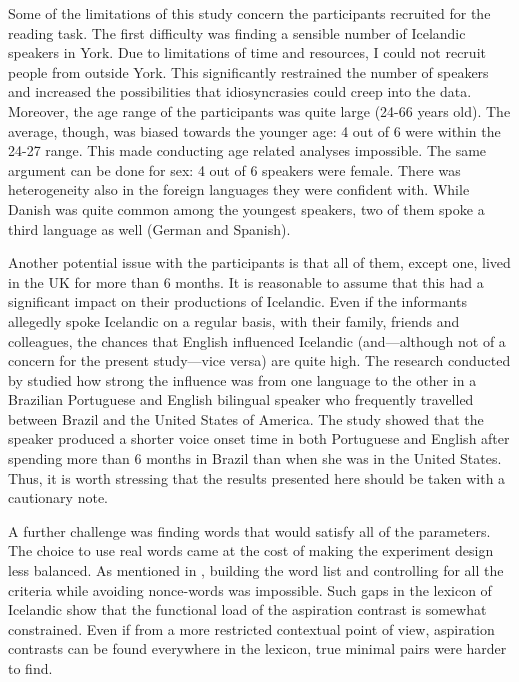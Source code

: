 \documentclass[11pt,a4paper,openany]{memoir}\usepackage[]{graphicx}\usepackage[]{color}
\begin{document}
Some of the limitations of this study concern the participants recruited for the reading task.
The first difficulty was finding a sensible number of Icelandic speakers in York.
Due to limitations of time and resources, I could not recruit people from outside York.
This significantly restrained the number of speakers and increased the possibilities that idiosyncrasies could creep into the data.
Moreover, the age range of the participants was quite large (24-66 years old).
The average, though, was biased towards the younger age: 4 out of 6 were within the 24-27 range.
This made conducting age related analyses impossible.
The same argument can be done for sex: 4 out of 6 speakers were female.
There was heterogeneity also in the foreign languages they were confident with.
While Danish was quite common among the youngest speakers, two of them spoke a third language as well (German and Spanish).

Another potential issue with the participants is that all of them, except one, lived in the UK for more than 6 months.
It is reasonable to assume that this had a significant impact on their productions of Icelandic.
Even if the informants allegedly spoke Icelandic on a regular basis, with their family, friends and colleagues, the chances that English influenced Icelandic (and---although not of a concern for the present study---vice versa) are quite high.
The research conducted by \citet{sancier1997} studied how strong the influence was from one language to the other in a Brazilian Portuguese and English bilingual speaker who frequently travelled between Brazil and the United States of America.
The study showed that the speaker produced a shorter voice onset time in both Portuguese and English after spending more than 6 months in Brazil than when she was in the United States.
Thus, it is worth stressing that the results presented here should be taken with a cautionary note.

A further challenge was finding words that would satisfy all of the parameters.
The choice to use real words came at the cost of making the experiment design less balanced.
As mentioned in , building the word list and controlling for all the criteria while avoiding nonce-words was impossible.
Such gaps in the lexicon of Icelandic show that the functional load of the aspiration contrast is somewhat constrained.
Even if from a more restricted contextual point of view, aspiration contrasts can be found everywhere in the lexicon, true minimal pairs were harder to find.
\end{document}
